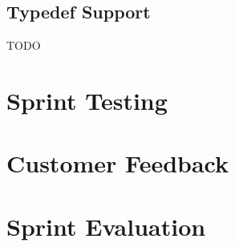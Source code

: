 \subsection{Typedef Support}
TODO




\section{Sprint Testing}


\section{Customer Feedback}


\section{Sprint Evaluation}


